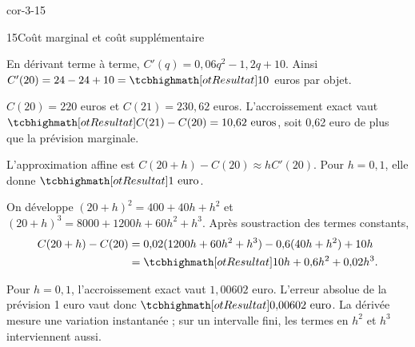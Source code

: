 \begin{blocLivre}{cor-3-15}
\begin{corrige}{15}{Coût marginal et coût supplémentaire}
\begin{questions}
\item En dérivant terme à terme, $C'(q)=0{,}06q^2-1{,}2q+10$.
Ainsi $C'(20)=24-24+10=\res{10}$ euros par objet.
\item $C(20)=220$ euros et $C(21)=230{,}62$ euros. L’accroissement exact vaut
$\res{C(21)-C(20)=10{,}62\text{ euros}}$, soit 0,62 euro de plus que la prévision marginale.
\item L’approximation affine est $C(20+h)-C(20)\approx hC'(20)$.
Pour $h=0{,}1$, elle donne $\res{1\text{ euro}}$.
\item On développe $(20+h)^2=400+40h+h^2$ et $(20+h)^3=8000+1200h+60h^2+h^3$.
Après soustraction des termes constants,
\begin{align*}
C(20+h)-C(20)&=0{,}02(1200h+60h^2+h^3)-0{,}6(40h+h^2)+10h\\
&=\res{10h+0{,}6h^2+0{,}02h^3}.
\end{align*}
\item Pour $h=0{,}1$, l’accroissement exact vaut $1{,}00602$ euro.
L’erreur absolue de la prévision 1 euro vaut donc $\res{0{,}00602\text{ euro}}$.
La dérivée mesure une variation instantanée ; sur un intervalle fini, les termes en $h^2$ et $h^3$ interviennent aussi.
\end{questions}

\end{corrige}
\end{blocLivre}
